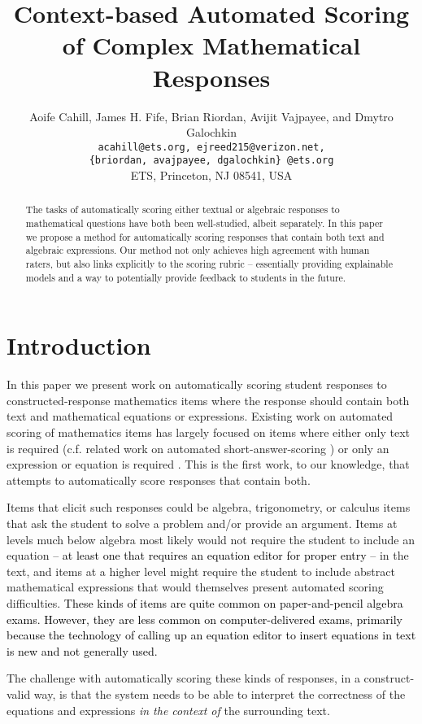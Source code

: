 \documentclass[11pt,a4paper]{article}
\title{Context-based Automated Scoring of Complex Mathematical Responses}
\author{Aoife Cahill, James H. Fife, Brian Riordan, Avijit Vajpayee, and Dmytro Galochkin  \\
\texttt{acahill@ets.org, ejreed215@verizon.net,} \\
\texttt{\{briordan, avajpayee, dgalochkin\} @ets.org} \\
ETS, Princeton, NJ 08541, USA}
\date{}
\newcommand{\AC}{\textcolor{black}} %
\begin{document}
\maketitle
\begin{abstract}
The tasks of automatically scoring either textual or algebraic responses to mathematical questions have both been well-studied, albeit separately. In this paper we propose a method for automatically scoring responses that contain both text and algebraic expressions. Our method not only achieves high agreement with human raters, but also links explicitly to the scoring rubric -- essentially providing explainable models and a way to potentially provide feedback to students in the future. 
\end{abstract}


\section{Introduction}
In this paper we present work on automatically scoring student responses to constructed-response mathematics items where the response should contain both text and mathematical equations or expressions. Existing work on automated scoring of mathematics items has largely focused on items where either only text is required (c.f. related work on automated short-answer-scoring \cite{galhardi2018machine, burrows2015eras}) or only an expression or equation is required \cite{drijvers2018digital,fife2017m,sangwin2004assessing}. %
This is the first work, to our knowledge, that attempts to automatically score responses that contain both. 

Items that elicit such responses could be algebra, trigonometry, or calculus items that ask the student to solve a problem and/or provide an argument. Items at levels much below algebra most likely would not require the student to include an equation \AC{-- at least one that requires an equation editor for proper entry --} in the text, and items at a higher level might require the student to include abstract mathematical expressions that would themselves present automated scoring difficulties. \AC{These kinds of items are quite common on paper-and-pencil algebra exams. However, they are less common on computer-delivered exams, primarily because the technology of calling up an equation editor to insert equations in text is new and not generally used.}

The challenge with automatically scoring these kinds of responses, in a construct-valid way, is that the system needs to be able to interpret the correctness of the equations and expressions {\em in the context of} the surrounding text. 
\end{document}

